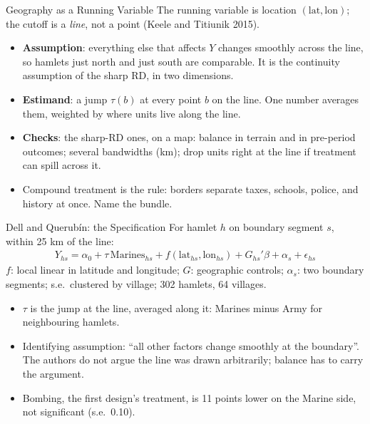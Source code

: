 \documentclass[aspectratio=169,11pt,xcolor=dvipsnames]{beamer}
\newcommand{\srcp}[1]{{\scriptsize\color{gray}(#1)}}
\begin{document}
\begin{frame}{Geography as a Running Variable}
The running variable is location $(\text{lat}, \text{lon})$; the cutoff is a
\emph{line}, not a point \srcp{Keele and Titiunik 2015}.
\begin{itemize}\itemsep3pt
  \item \textbf{Assumption}: everything else that affects $Y$ changes smoothly
        across the line, so hamlets just north and just south are comparable.
        It is the continuity assumption of the sharp RD, in two dimensions.
  \item \textbf{Estimand}: a jump $\tau(b)$ at every point $b$ on the line. One
        number averages them, weighted by where units live along the line.
  \item \textbf{Checks}: the sharp-RD ones, on a map: balance in terrain and in
        pre-period outcomes; several bandwidths (km); drop units right at the line
        if treatment can spill across it.
  \item \alert{Compound treatment is the rule}: borders separate taxes, schools,
        police, and history at once. Name the bundle.
\end{itemize}
\end{frame}

\begin{frame}{Dell and Querubín: the Specification}
For hamlet $h$ on boundary segment $s$, within 25 km of the line:
\begin{align*}
  Y_{hs} = \alpha_0 + \tau\,\text{Marines}_{hs} + f(\text{lat}_{hs}, \text{lon}_{hs})
           + G_{hs}'\beta + \alpha_s + \epsilon_{hs}
\end{align*}
{\small $f$: local linear in latitude and longitude; $G$: geographic controls;
$\alpha_s$: two boundary segments; s.e.\ clustered by village; 302 hamlets, 64 villages.}
\vskip4pt
\begin{itemize}\itemsep3pt
  \item $\tau$ is the jump at the line, averaged along it: Marines minus Army for
        neighbouring hamlets.
  \item Identifying assumption: ``all other factors change smoothly at the boundary''.
        The authors do not argue the line was drawn arbitrarily; balance has to
        carry the argument.
  \item Bombing, the first design's treatment, is 11 points lower on the
        Marine side, not significant (s.e.\ 0.10).
\end{itemize}
\end{frame}
\end{document}
